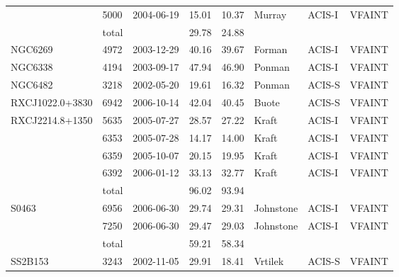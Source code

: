 \documentclass[structabstract]{aa}
\begin{document}
\begin{table}[!h]
\begin{center}
\begin{tabularx}{\textwidth}{XlXrrXXX}
 & 5000 & 2004-06-19 & 15.01 & 10.37 & Murray & ACIS-I & VFAINT \\ 
 & total &  & 29.78 & 24.88 &  &  &  \\ \hline
NGC6269 & 4972 & 2003-12-29 & 40.16 & 39.67 & Forman & ACIS-I & VFAINT \\ \hline
NGC6338 & 4194 & 2003-09-17 & 47.94 & 46.90 & Ponman & ACIS-I & VFAINT \\ \hline
NGC6482 & 3218 & 2002-05-20 & 19.61 & 16.32 & Ponman & ACIS-S & VFAINT \\ \hline
RXCJ1022.0+3830 & 6942 & 2006-10-14 & 42.04 & 40.45 & Buote & ACIS-S & VFAINT \\ \hline
RXCJ2214.8+1350 & 5635 & 2005-07-27 & 28.57 & 27.22 & Kraft & ACIS-I & VFAINT \\ 
 & 6353 & 2005-07-28 & 14.17 & 14.00 & Kraft & ACIS-I & VFAINT \\ 
 & 6359 & 2005-10-07 & 20.15 & 19.95 & Kraft & ACIS-I & VFAINT \\ 
 & 6392 & 2006-01-12 & 33.13 & 32.77 & Kraft & ACIS-I & VFAINT \\ 
 & total &  & 96.02 & 93.94 &  &  &  \\ \hline
S0463 & 6956 & 2006-06-30 & 29.74 & 29.31 & Johnstone & ACIS-I & VFAINT \\ 
 & 7250 & 2006-06-30 & 29.47 & 29.03 & Johnstone & ACIS-I & VFAINT \\ 
 & total &  & 59.21 & 58.34 &  &  &  \\ \hline
SS2B153 & 3243 & 2002-11-05 & 29.91 & 18.41 & Vrtilek & ACIS-S & VFAINT \\ \hline
\end{tabularx}
\end{center}
\label{tab:obs}
\end{table}
\clearpage
\renewcommand{\textfraction}{0.0001}
\renewcommand{\topfraction}{0.99}
\renewcommand{\bottomfraction}{0.99}
\renewcommand{\floatpagefraction}{0.98}
\end{document}
